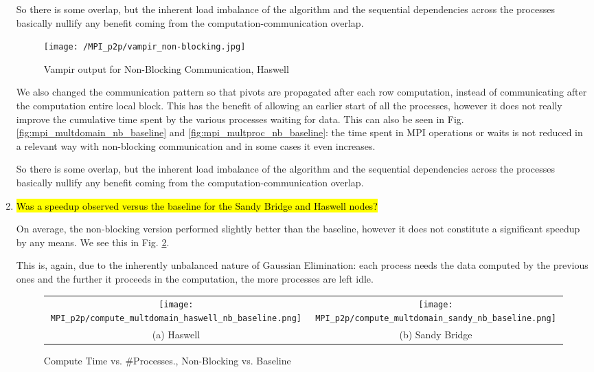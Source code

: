 \begin{enumerate}
	So there is some overlap, but the inherent load imbalance of the algorithm and the sequential dependencies across the processes basically nullify any benefit coming from the computation-communication overlap.
	
	\begin{figure}[h] %
	\begin{center}
			\texttt{[image: /MPI\_p2p/vampir\_non-blocking.jpg]}
		\caption{Vampir output for Non-Blocking Communication, Haswell}
		\label{fig:vampir_haswell_non_blocking}
	\end{center}
	\end{figure}

	We also changed the communication pattern so that pivots are propagated after each row computation, instead of communicating after the computation entire local block. This has the benefit of allowing an earlier start of all the processes, however it does not really improve the cumulative time spent by the various processes waiting for data. This can also be seen in Fig.\ref{fig:mpi_multdomain_nb_baseline} and \ref{fig:mpi_multproc_nb_baseline}: the time spent in MPI operations or waits is not reduced in a relevant way with non-blocking communication and in some cases it even increases.

	So there is some overlap, but the inherent load imbalance of the algorithm and the sequential dependencies across the processes basically nullify any benefit coming from the computation-communication overlap.

\item \hl{Was a speedup observed versus the baseline for the Sandy Bridge and Haswell nodes?}

	On average, the non-blocking version performed slightly better than the baseline, however it does not constitute a significant speedup by any means. We see this in Fig. \ref{fig:compute_multdomain_nb_baseline}.

	This is, again, due to the inherently unbalanced nature of Gaussian Elimination: each process needs the data computed by the previous ones and the further it proceeds in the computation, the more processes are left idle.	
	
	 \begin{figure}[h] %
		\hspace*{-0.25\linewidth}\begin{tabular}{cc}
			\texttt{[image: MPI\_p2p/compute\_multdomain\_haswell\_nb\_baseline.png]} & \texttt{[image: MPI\_p2p/compute\_multdomain\_sandy\_nb\_baseline.png]} \\
			(a) Haswell &  (b) Sandy Bridge\\[6pt]
		\end{tabular}
		\caption{Compute Time vs. \#Processes., Non-Blocking vs. Baseline}
		\label{fig:compute_multdomain_nb_baseline}
	\end{figure}
	

\end{enumerate}
